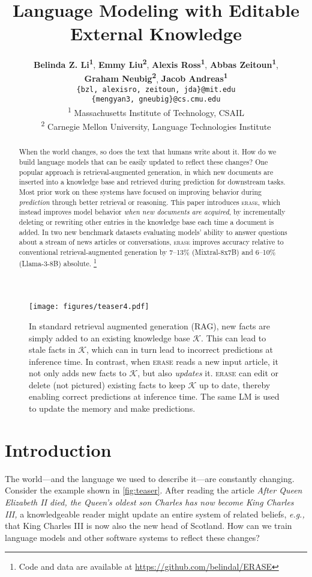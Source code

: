 \documentclass[11pt]{article}
\title{Language Modeling with Editable External Knowledge}
\author{
 \textbf{Belinda Z. Li\textsuperscript{1}},
 \textbf{Emmy Liu\textsuperscript{2}},
 \textbf{Alexis Ross\textsuperscript{1}},
 \textbf{Abbas Zeitoun\textsuperscript{1}},
\\
 \textbf{Graham Neubig\textsuperscript{2}},
 \textbf{Jacob Andreas\textsuperscript{1}}
\\
\texttt{\{bzl, alexisro, zeitoun, jda\}@mit.edu} \\
\texttt{\{mengyan3, gneubig\}@cs.cmu.edu}
\\
\textsuperscript{1} Massachusetts Institute of Technology, CSAIL \\
\textsuperscript{2} Carnegie Mellon University, Language Technologies Institute
}
\newcommand{\ourmethod}{\textsc{erase}\xspace}
\newcommand{\kb}{\mathcal{K}}
\newcommand{\eg}{\emph{e.g.,}\xspace}
\newcommand{\quotetext}[1]{\emph{#1}}
\begin{document}
\maketitle
\begin{abstract}
When the world changes, so does the text that humans write about it. How do we build language models that can be easily updated to reflect these changes? One popular approach is retrieval-augmented generation, in which new documents are inserted into a knowledge base and retrieved during prediction for downstream tasks.
Most prior work on these systems have focused on improving behavior during \textit{prediction} through better retrieval or reasoning.
This paper introduces \ourmethod, which instead improves model behavior \emph{when new documents are acquired}, by incrementally deleting or rewriting other entries in the knowledge base each time a document is added.
In two new benchmark datasets evaluating models' ability to answer questions about a stream of news articles or conversations, \ourmethod
improves accuracy relative to conventional retrieval-augmented generation by 7--13\% (Mixtral-8x7B) and 6--10\% (Llama-3-8B) absolute.%
\footnote{Code and data are available at \url{https://github.com/belindal/ERASE}}%
\end{abstract}

\begin{figure}[t!]
    \centering \texttt{[image: figures/teaser4.pdf]}
    \caption{
    In standard retrieval augmented generation (RAG), new facts are simply added to an existing knowledge base $\kb$. This can lead to stale facts in $\kb$, which can in turn lead to incorrect predictions at inference time. In contrast, when \ourmethod reads a new input article, it not only adds new facts to $\kb$, but also \emph{updates} it. \ourmethod can edit or delete (not pictured) existing facts to keep $\kb$ up to date, thereby enabling correct predictions at inference time. The same LM is used to update the memory and make predictions.
    }
    \label{fig:teaser}
\end{figure}
\section{Introduction}
\label{sec:intro}
The world---and the language we used to describe it---are constantly changing.
Consider the example shown in \autoref{fig:teaser}. After reading the article \quotetext{After Queen Elizabeth II died, the Queen's oldest son Charles has now become King Charles III,} a knowledgeable reader might update an entire system of related beliefs, \eg that King Charles III is now also the new head of Scotland. 
How can we train language models and other software systems to reflect these changes?
\end{document}
